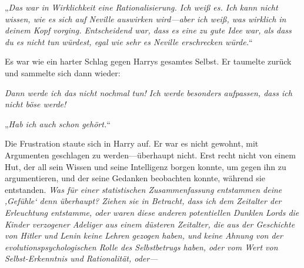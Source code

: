 „\emph{Das war in Wirklichkeit eine Rationalisierung. Ich weiß es. Ich kann nicht wissen, wie es sich auf Neville auswirken wird—aber ich weiß, was wirklich in deinem Kopf vorging. Entscheidend war, dass es eine zu gute Idee war, als dass du es \emph{nicht} tun würdest, egal wie sehr es Neville erschrecken würde.}“

Es war wie ein harter Schlag gegen Harrys gesamtes Selbst. Er taumelte zurück und sammelte sich dann wieder:

\emph{Dann werde ich das nicht nochmal tun! Ich werde besonders aufpassen, dass ich nicht böse werde! }

„\emph{Hab ich auch schon gehört.}“

Die Frustration staute sich in Harry auf. Er war es nicht gewohnt, mit Argumenten geschlagen zu werden—überhaupt nicht. Erst recht nicht von einem Hut, der all sein Wissen und seine Intelligenz borgen konnte, um gegen ihn zu argumentieren, und der seine Gedanken beobachten konnte, während sie entstanden. \emph{Was für einer statistischen Zusammenfassung entstammen deine ‚Gefühle‘ denn überhaupt? Ziehen sie in Betracht, dass ich dem Zeitalter der Erleuchtung entstamme, oder waren diese anderen potentiellen Dunklen Lords die Kinder verzogener Adeliger aus einem düsteren Zeitalter, die aus der Geschichte von Hitler und Lenin keine Lehren gezogen haben, und keine Ahnung von der evolutionspsychologischen Rolle des Selbstbetrugs haben, oder vom Wert von Selbst-Erkenntnis und Rationalität, oder—}

